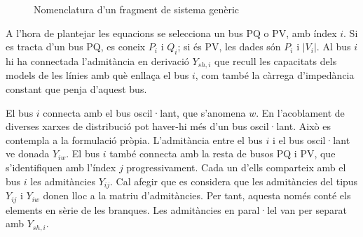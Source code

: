 \begin{figure}[!htb]
\begin{center}
    \caption{Nomenclatura d'un fragment de sistema genèric}
    \label{fig:nomenclatura}
    \end{center}
\end{figure}

A l'hora de plantejar les equacions se selecciona un bus PQ o PV, amb índex $i$. Si es tracta d'un bus PQ, es coneix $P_i$ i $Q_i$; si és PV, les dades són $P_i$ i $|V_i|$. Al bus $i$ hi ha connectada l'admitància en derivació $Y_{sh,i}$ que recull les capacitats dels models de les línies amb què enllaça el bus $i$, com també la càrrega d'impedància constant que penja d'aquest bus.

El bus $i$ connecta amb el bus oscil·lant, que s'anomena $w$. En l'acoblament de diverses xarxes de distribució pot haver-hi més d'un bus oscil·lant. Això es contempla a la formulació pròpia. L'admitància entre el bus $i$ i el bus oscil·lant ve donada $Y_{iw}$. El bus $i$ també connecta amb la resta de busos PQ i PV, que s'identifiquen amb l'índex $j$ progressivament. Cada un d'ells comparteix amb el bus $i$ les admitàncies $Y_{ij}$. Cal afegir que es considera que les admitàncies del tipus $Y_{ij}$ i $Y_{iw}$ donen lloc a la matriu d'admitàncies. Per tant, aquesta només conté els elements en sèrie de les branques. Les admitàncies en paral·lel van per separat amb $Y_{sh,i}$. 

